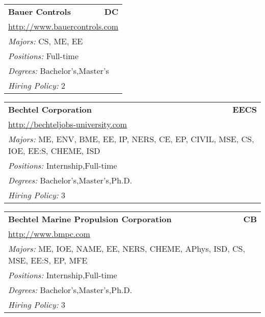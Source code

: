 \documentclass[twoside]{article}
\begin{document}
\begin{center}
\begin{multicols}{3}
\begin{FlushLeft}
\begin{minipage}{.9\columnwidth}
\end{minipage}
 
\begin{minipage}{.9\columnwidth}\begin{tabularx}{.95\columnwidth}{Xr}
                 {\Large\bf Bauer Controls} & {\Large\bf DC}\\
    \multicolumn{2}{p{.95\columnwidth}}{\url{http://www.bauercontrols.com}}\\
    \multicolumn{2}{p{.95\columnwidth}}{\emph{Majors:} CS, ME, EE}\\
    \multicolumn{2}{p{.95\columnwidth}}{\emph{Positions:} Full-time}\\
    \multicolumn{2}{p{.95\columnwidth}}{\emph{Degrees:} Bachelor's,Master's}\\
    \multicolumn{2}{p{.95\columnwidth}}{\emph{Hiring Policy:} 2}\\
    \end{tabularx}
    
\end{minipage}
 
\begin{minipage}{.9\columnwidth}\begin{tabularx}{.95\columnwidth}{Xr}
                 {\Large\bf Bechtel Corporation} & {\Large\bf EECS}\\
    \multicolumn{2}{p{.95\columnwidth}}{\url{http://bechteljobs-university.com}}\\
    \multicolumn{2}{p{.95\columnwidth}}{\emph{Majors:} ME, ENV, BME, EE, IP, NERS, CE, EP, CIVIL, MSE, CS, IOE, EE:S, CHEME, ISD}\\
    \multicolumn{2}{p{.95\columnwidth}}{\emph{Positions:} Internship,Full-time}\\
    \multicolumn{2}{p{.95\columnwidth}}{\emph{Degrees:} Bachelor's,Master's,Ph.D.}\\
    \multicolumn{2}{p{.95\columnwidth}}{\emph{Hiring Policy:} 3}\\
    \end{tabularx}
    
\end{minipage}
 
\begin{minipage}{.9\columnwidth}\begin{tabularx}{.95\columnwidth}{Xr}
                 {\Large\bf Bechtel Marine Propulsion Corporation} & {\Large\bf CB}\\
    \multicolumn{2}{p{.95\columnwidth}}{\url{http://www.bmpc.com}}\\
    \multicolumn{2}{p{.95\columnwidth}}{\emph{Majors:} ME, IOE, NAME, EE, NERS, CHEME, APhys, ISD, CS, MSE, EE:S, EP, MFE}\\
    \multicolumn{2}{p{.95\columnwidth}}{\emph{Positions:} Internship,Full-time}\\
    \multicolumn{2}{p{.95\columnwidth}}{\emph{Degrees:} Bachelor's,Master's,Ph.D.}\\
    \multicolumn{2}{p{.95\columnwidth}}{\emph{Hiring Policy:} 3}\\
    \end{tabularx}
    

\end{minipage}
\end{FlushLeft}
\end{multicols}
\end{center}
\end{document}
